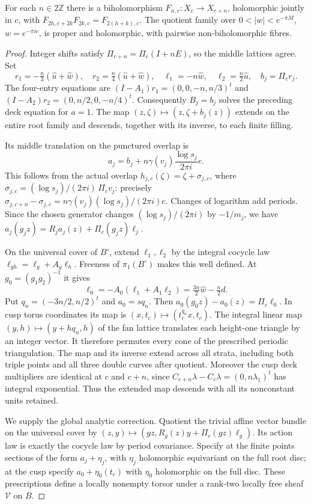 \begin{proposition}[A.3.1; Proved]\label{st:A.3.1}
For each $n\in2\mathbb Z$ there is a biholomorphism $F_{n,c}:X_c\to X_{c+n}$, holomorphic jointly in $c$, with $F_{2h,c+2k}F_{2k,c}=F_{2(h+k),c}$. The quotient family over $0<|w|<e^{-\pi M}$, $w=e^{-\pi ic}$, is proper and holomorphic, with pairwise non-biholomorphic fibres.
\end{proposition}
\begin{proof}
Integer shifts satisfy $\Pi_{c+n}=\Pi_c(I+nE)$, so the middle lattices agree. Set
\[
 r_1=-\tfrac n3(\widehat u+\widehat w),\quad
 r_2=\tfrac n4(\widehat u+\widehat w),\quad
 \ell_1=-n\widehat w,\quad \ell_2=\tfrac n2\widehat u,\quad b_j=\Pi_cr_j.
\]
The four-entry equations are $(I-A_1)r_1=(0,0,-n,n/3)^t$ and $(I-A_2)r_2=(0,n/2,0,-n/4)^t$. Consequently $B_j=b_j$ solves the preceding deck equation for $a=1$. The map $(z,\zeta)\mapsto(z,\zeta+b_j(z))$ extends on the entire root family and descends, together with its inverse, to each finite filling.

Its middle translation on the punctured overlap is
\[
 a_j=b_j+n\gamma(v_j)\frac{\log s_j}{2\pi i}e.
\]
This follows from the actual overlap $h_{j,c}(\zeta)=\zeta+\sigma_{j,c}$, where $\sigma_{j,c}=(\log s_j)/(2\pi i)\,\Pi_cv_j$: precisely $\sigma_{j,c+n}-\sigma_{j,c}=n\gamma(v_j)(\log s_j)/(2\pi i)e$. Changes of logarithm add periods. Since the chosen generator changes $(\log s_j)/(2\pi i)$ by $-1/m_j$, we have $a_j(g_jz)=R_ja_j(z)+\Pi_c(g_jz)\ell_j$.

On the universal cover of $B^\circ$, extend $\ell_1,\ell_2$ by the integral cocycle law $\ell_{gh}=\ell_g+A_g\ell_h$. Freeness of $\pi_1(B^\circ)$ makes this well defined. At $g_0=(g_1g_2)^{-1}$ it gives
\[
 \ell_0=-A_0(\ell_1+A_1\ell_2)=\tfrac{3n}2\widehat w-\tfrac n2d.
\]
Put $q_n=(-3n/2,n/2)^t$ and $a_0=sq_n$. Then $a_0(g_0z)-a_0(z)=\Pi_c\ell_0$. In cusp torus coordinates its map is $(x,t_c)\mapsto(t_c^{q_n}x,t_c)$. The integral linear map $(y,h)\mapsto(y+hq_n,h)$ of the fan lattice translates each height-one triangle by an integer vector. It therefore permutes every cone of the prescribed periodic triangulation. The map and its inverse extend across all strata, including both triple points and all three double curves after quotient. Moreover the cusp deck multipliers are identical at $c$ and $c+n$, since $C_{c+n}\lambda-C_c\lambda=(0,n\lambda_1)^t$ has integral exponential. Thus the extended map descends with all its nonconstant units retained.

We supply the global analytic correction. Quotient the trivial affine vector bundle on the universal cover by
$(z,y)\mapsto(gz,R_g(z)y+\Pi_c(gz)\ell_g)$. Its action law is exactly the cocycle law by period covariance. Specify at the finite points sections of the form $a_j+\eta_j$, with $\eta_j$ holomorphic equivariant on the full root disc; at the cusp specify $a_0+\eta_0(t_c)$ with $\eta_0$ holomorphic on the full disc. These prescriptions define a locally nonempty torsor under a rank-two locally free sheaf $\mathcal V$ on $B$.


\end{proof}
